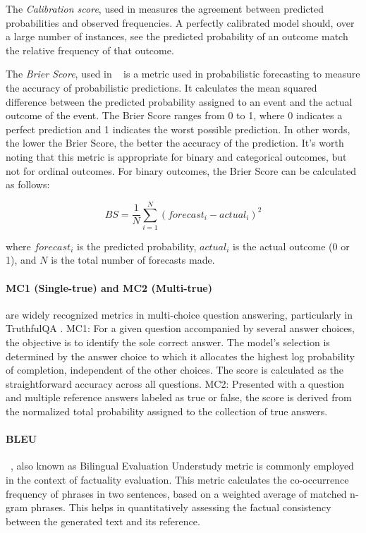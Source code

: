 The \emph{Calibration score}, used in  \citep{lin2022teaching, kadavath2022language} measures the agreement between predicted probabilities and observed frequencies. A perfectly calibrated model should, over a large number of instances, see the predicted probability of an outcome match the relative frequency of that outcome.

The \emph{Brier Score}, used in ~\citep{kadavath2022language} is a metric used in probabilistic forecasting to measure the accuracy of probabilistic predictions. It calculates the mean squared difference between the predicted probability assigned to an event and the actual outcome of the event. 
The Brier Score ranges from 0 to 1, where 0 indicates a perfect prediction and 1 indicates the worst possible prediction. In other words, the lower the Brier Score, the better the accuracy of the prediction. It's worth noting that this metric is appropriate for binary and categorical outcomes, but not for ordinal outcomes. 
For binary outcomes, the Brier Score can be calculated as follows:

\begin{equation}
BS = \frac{1}{N} \sum_{i=1}^{N} (forecast_{i} - actual_{i})^2
\end{equation}

where \(forecast_{i}\) is the predicted probability, \(actual_{i}\) is the actual outcome (0 or 1), and \(N\) is the total number of forecasts made.


\paragraph{MC1 (Single-true) and MC2 (Multi-true)} are widely recognized metrics in multi-choice question answering, particularly in TruthfulQA \citep{TruthfulQA}.
MC1: For a given question accompanied by several answer choices, the objective is to identify the sole correct answer. The model's selection is determined by the answer choice to which it allocates the highest log probability of completion, independent of the other choices. The score is calculated as the straightforward accuracy across all questions.
MC2: Presented with a question and multiple reference answers labeled as true or false, the score is derived from the normalized total probability assigned to the collection of true answers.

\paragraph{BLEU}~\citep{papineni2002bleu}, also known as Bilingual Evaluation Understudy metric is commonly employed in the context of factuality evaluation. This metric calculates the co-occurrence frequency of phrases in two sentences, based on a weighted average of matched n-gram phrases. This helps in quantitatively assessing the factual consistency between the generated text and its reference.

